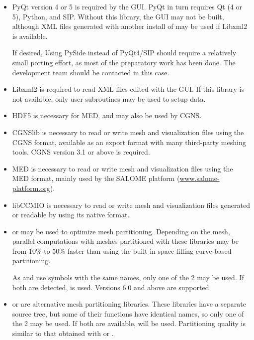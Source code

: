 \documentclass[a4paper,10pt,twoside]{csshortdoc}
\begin{document}
\begin{itemize}

\item PyQt version 4 or 5 is required by the \CS GUI. PyQt in turn requires
      Qt (4 or 5), Python, and SIP. Without this library, the GUI may not be
      built, although XML files generated with another install of \CS
      may be used if Libxml2 is available.

      If desired, Using PySide instead of PyQt4/SIP should require a relatively
      small porting effort, as most of the preparatory work has been done.
      The development team should be contacted in this case.

\item Libxml2 is required to read XML files edited with the GUI.
      If this library is not available, only user subroutines may
      be used to setup data.

\item HDF5 is necessary for MED, and may also be used by CGNS.

\item CGNSlib is necessary to read or write mesh and visualization files
      using the CGNS format, available as an export format with many
      third-party meshing tools. CGNS version 3.1 or above is required.

\item MED is necessary to read or write mesh and visualization files
      using the MED format, mainly used by the SALOME platform
      (\url{www.salome-platform.org}).

\item libCCMIO is necessary to read or write mesh and visualization files
      generated or readable by \starccmp using its native format.

\item \scotch or \ptscotch may be used to optimize mesh partitioning.
      Depending on the mesh, parallel computations with meshes partitioned
      with these libraries may be from 10\% to 50\% faster than using the
      built-in space-filling curve based partitioning.

      As \scotch and \ptscotch use symbols with the same names, only
      one of the 2 may be used. If both are detected, \ptscotch is used.
      Versions 6.0 and above are supported.

\item \metis or \parmetis are alternative mesh partitioning libraries.
      These libraries have a separate source tree, but some of their
      functions have identical names, so only one of the 2 may be used.
      If both are available, \parmetis will be used. Partitioning
      quality is similar to that obtained with \scotch or
      \ptscotch.


\end{itemize}
\end{document}
